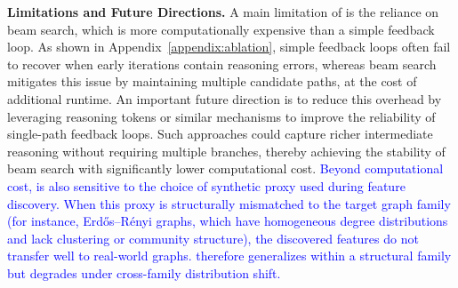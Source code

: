\textbf{Limitations and Future Directions.} A main limitation of \llm is the reliance on beam search, which is more computationally expensive than a simple feedback loop. As shown in Appendix~\ref{appendix:ablation}, simple feedback loops often fail to recover when early iterations contain reasoning errors, whereas beam search mitigates this issue by maintaining multiple candidate paths, at the cost of additional runtime. An important future direction is to reduce this overhead by leveraging reasoning tokens or similar mechanisms to improve the reliability of single-path feedback loops. Such approaches could capture richer intermediate reasoning without requiring multiple branches, thereby achieving the stability of beam search with significantly lower computational cost. \textcolor{blue}{Beyond computational cost, \llm is also sensitive to the choice of synthetic proxy used during feature discovery. When this proxy is structurally mismatched to the target graph family (for instance, Erd\H{o}s--R\'{e}nyi graphs, which have homogeneous degree distributions and lack clustering or community structure), the discovered features do not transfer well to real-world graphs. \llm therefore generalizes within a structural family but degrades under cross-family distribution shift.}



